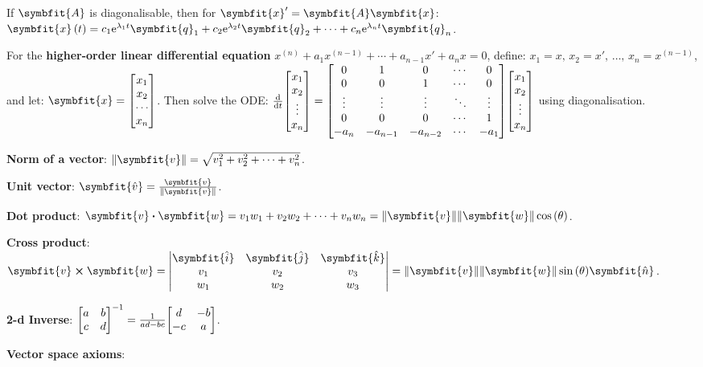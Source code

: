 \documentclass{article}
\begin{document}
\noindent If $\symbfit{A}$ is diagonalisable, then for $\symbfit{x}' = \symbfit{A} \symbfit{x}$: $\func{\symbfit{x}}{t} = c_1 \e^{\lambda_1 t} \symbfit{q}_1 + c_2 \e^{\lambda_2 t} \symbfit{q}_2 + \cdots + c_n \e^{\lambda_n t} \symbfit{q}_n$.
	
\noindent For the \textbf{higher-order linear differential equation} $x^{\left( n \right)} + a_1 x^{\left( n-1 \right)} + \cdots + a_{n-1} x' + a_n x = 0$, define: $x_1 = x,\, x_2 = x',\, \dots,\, x_n = x^{\left( n-1 \right)}$, and let: $\symbfit{x}=\mqty[x_1 \\ x_2 \\ \cdots \\ x_n]$. Then solve the ODE: 
$\dv{t}\mqty[
	x_1 \\
	x_2 \\
	\vdotswithin{x_3} \\
	x_n	
] = \mqty[
	0 & 1 & 0 & \cdots & 0 \\
	0 & 0 & 1 & \cdots & 0 \\
	\vdots & \vdots & \vdots & \ddots & \vdots \\
	0 & 0 & 0 & \cdots & 1 \\
	-a_n & -a_{n-1} & -a_{n-2} & \cdots & -a_1
] \mqty[
	x_1 \\
	x_2 \\
	\vdotswithin{x_3} \\
	x_n	
]$ using diagonalisation.
\thispagestyle{empty}
\pagebreak

\noindent\textbf{Norm of a vector}: $\norm{\symbfit{v}} = \sqrt{v_1^2 + v_2^2+\dots+v_n^2}$.

\noindent\textbf{Unit vector}: $\symbfit{\hat{v}} = \frac{\symbfit{v}}{\norm{\symbfit{v}}}$.

\noindent\textbf{Dot product}: $\symbfit{v}\vdot\symbfit{w}= v_1 w_1 + v_2 w_2 + \cdots + v_n w_n = \norm{\symbfit{v}} \norm{\symbfit{w}} \cos{\left(\theta\right)}$.

\noindent\textbf{Cross product}: $
\symbfit{v}\cross\symbfit{w} = 
\mqty|
	\symbfit{\hat{i}} & \symbfit{\hat{j}} & \symbfit{\hat{k}} \\
	v_1 & v_2 & v_3 \\
	w_1 & w_2 & w_3
| =
\norm{\symbfit{v}}\norm{\symbfit{w}}\sin{\left(\theta\right)}\symbfit{\hat{n}}
$.

\noindent\textbf{2-d Inverse}: $\mqty[a & b \\ c & d]^{-1} = \frac{1}{ad - bc} \mqty[d & -b \\ -c & a]$.

\noindent\textbf{Vector space axioms}:
\end{document}

